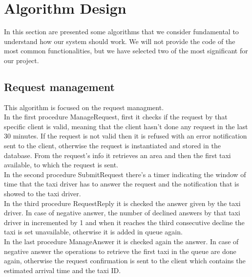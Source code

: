 \section{Algorithm Design}
	In this section are presented some algorithms that we consider fundamental to understand how
	our system should work. We will not provide the code of the most common functionalities, but we
	have selected two of the most significant for our project.
	\subsection{Request management}
	This algorithm is focused on the request managment.\\ In the first procedure ManageRequest, first it checks if the request by that specific client is valid, meaning that the client hasn't done any request in the last 30 minutes. If the request is not valid then it is refused with an error notification sent to the client, otherwise the request is instantiated and stored in the database. From the request's info it retrieves an area and then the first taxi available, to which the request is sent.\\ In the second procedure SubmitRequest there's a timer indicating the window of time that the taxi driver has to answer the request and the notification that is showed to the taxi driver.\\ In the third procedure RequestReply it is checked the answer given by the taxi driver. In case of negative answer, the number of declined answers by that taxi driver in incremented by 1 and when it reaches the third consecutive decline the taxi is set unavailable, otherwise it is added in queue again.\\ In the last procedure ManageAnswer it is checked again the answer. In case of negative answer the operations to retrieve the first taxi in the queue are done again, otherwise the request confirmation is sent to the client which contains the estimated arrival time and the taxi ID.
